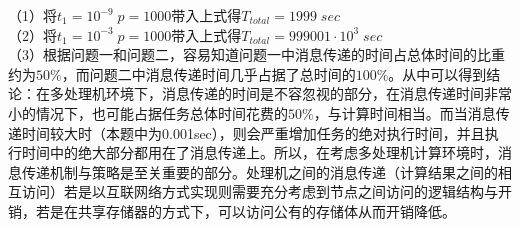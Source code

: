 \documentclass[12pt]{article}
\begin{document}
	（1）将$t_1=10^{-9}\;p=1000$带入上式得$T_{total}=1999\;sec$\\
	
	（2）将$t_1=10^{-3}\;p=1000$带入上式得$T_{total}=999001\cdot10^{3}\;sec$\\
	
	（3）根据问题一和问题二，容易知道问题一中消息传递的时间占总体时间的比重约为$
	50\%$，而问题二中消息传递时间几乎占据了总时间的$100\%$。从中可以得到结论：在多处理机环境下，消息传递的时间是不容忽视的部分，在消息传递时间非常小的情况下，也可能占据任务总体时间花费的$50\%$，与计算时间相当。而当消息传递时间较大时（本题中为0.001sec），则会严重增加任务的绝对执行时间，并且执行时间中的绝大部分都用在了消息传递上。所以，在考虑多处理机计算环境时，消息传递机制与策略是至关重要的部分。处理机之间的消息传递（计算结果之间的相互访问）若是以互联网络方式实现则需要充分考虑到节点之间访问的逻辑结构与开销，若是在共享存储器的方式下，可以访问公有的存储体从而开销降低。
\end{document}
